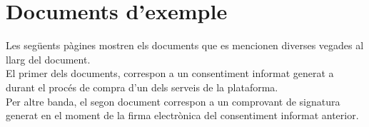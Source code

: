 \chapter{Documents d'exemple}
\label{appendix:documents}
Les següents pàgines mostren els documents que es mencionen diverses vegades al llarg del document.\\
\newline El primer dels documents, correspon a un consentiment informat generat a durant el procés de compra d'un dels serveis de la plataforma.\\
\newline Per altre banda, el segon document correspon a un comprovant de signatura generat en el moment de la firma electrònica del consentiment informat anterior.

